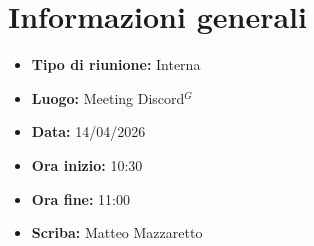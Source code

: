 \section{Informazioni generali}

\begin{itemize}
    \item \textbf{Tipo di riunione:} Interna
    \item \textbf{Luogo:} Meeting Discord$^G$
    \item \textbf{Data:} 14/04/2026
    \item \textbf{Ora inizio:} 10:30
    \item \textbf{Ora fine:} 11:00
    \item \textbf{Scriba:} Matteo Mazzaretto
\end{itemize}